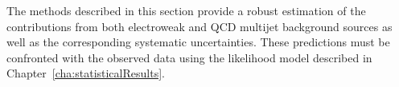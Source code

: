 The methods described in this section provide a robust estimation of the 
contributions from both electroweak and QCD multijet background sources
as well as the corresponding systematic uncertainties. These
predictions must be confronted with the observed data using the 
likelihood model described
in Chapter~\ref{cha:statisticalResults}.



